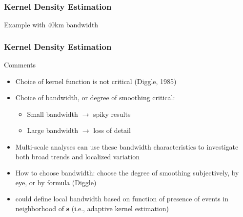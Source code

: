 \documentclass[10pt]{beamer}\usepackage[]{graphicx}\usepackage[]{color}
\newcommand{\vecss}{\boldsymbol{s}}
\newcommand{\bfigure}{\begin{figure}}
\newcommand{\efigure}{\end{figure}}
\newcommand{\bitemize}{\begin{itemize}}
\newcommand{\eitemize}{\end{itemize}}
\newcommand{\bblock}{\begin{block}}
\newcommand{\eblock}{\end{block}}
\begin{document}
\begin{frame}
\frametitle{Kernel Density Estimation}

\bblock{Example with 40km bandwidth}
\bfigure
{}
\efigure
\eblock

\end{frame}


\begin{frame}
\frametitle{Kernel Density Estimation}

\bblock{Comments}
\bitemize
\item Choice of kernel function is not critical (Diggle, 1985) 
\item Choice of bandwidth, or degree of smoothing critical: 
\bitemize
\item Small bandwidth $\rightarrow$ spiky results
\item Large bandwidth $\rightarrow$ loss of detail
\eitemize
\item Multi-scale analyses can use these bandwidth characteristics to investigate both broad trends and localized variation
\item How to choose bandwidth: choose the degree of smoothing subjectively, by eye, or by formula (Diggle) 
\item could define local bandwidth based on function of presence of events in neighborhood of $\vecss$ (i.e., adaptive kernel estimation)
\eitemize
\eblock

\end{frame}

\end{document}
